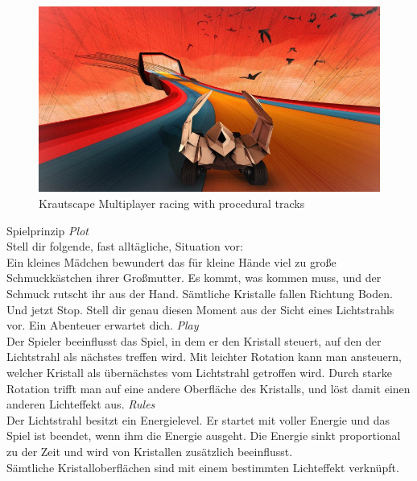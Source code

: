 {
	\begin{figure}
		\centering
		\includegraphics[width=\textwidth, height=0.7\textheight, keepaspectratio]{images/krautscape_ks1}
		\caption{Krautscape \linebreak Multiplayer racing with procedural tracks}
	\end{figure}
}

\slideonetoonetoone
{Spielprinzip}
{
	\emph{Plot}\\
	Stell dir folgende, fast alltägliche, Situation vor:\\
	Ein kleines Mädchen bewundert das für kleine Hände viel zu große Schmuckkästchen ihrer Großmutter. Es kommt, was kommen muss, und der Schmuck rutscht ihr aus der Hand. Sämtliche Kristalle fallen Richtung Boden. Und jetzt Stop. Stell dir genau diesen Moment aus der Sicht eines Lichtstrahls vor. Ein Abenteuer erwartet dich.
}
{
	\emph{Play}\\
	Der Spieler beeinflusst das Spiel, in dem er den Kristall steuert, auf den der Lichtstrahl als nächstes treffen wird. Mit leichter Rotation kann man ansteuern, welcher Kristall als übernächstes vom Lichtstrahl getroffen wird. Durch starke Rotation trifft man auf eine andere Oberfläche des Kristalls, und löst damit einen anderen Lichteffekt aus.
}
{
	\emph{Rules}\\
	Der Lichtstrahl besitzt ein Energielevel. Er startet mit voller Energie und das Spiel ist beendet, wenn ihm die Energie ausgeht. Die Energie sinkt proportional zu der Zeit und wird von Kristallen zusätzlich beeinflusst.\\
	Sämtliche Kristalloberflächen sind mit einem bestimmten Lichteffekt verknüpft.
}

